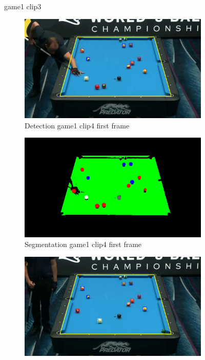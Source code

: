 \begin{figure}[H]
	\caption{game1 clip3}
\end{figure}

\begin{figure}[H]
	\centering
	\begin{subfigure}[b]{0.48\textwidth}
		\centering
		\includegraphics[width=\textwidth]{images/Detection/game1_clip4_detected_balls_first_frame.jpg}
		\caption{Detection game1 clip4 first frame}
		\label{fig: game1_clip4_first_frame_detected}
	\end{subfigure}
	\begin{subfigure}[b]{0.48\textwidth}
		\centering
		\includegraphics[width=\textwidth]{images/Segmentation/game1_clip4_segmented_balls_first_frame.jpg}
		\caption{Segmentation game1 clip4 first frame}
		\label{fig: game1_clip4_first_frame_segmented}
	\end{subfigure}
	\begin{subfigure}[b]{0.48\textwidth}
		\centering
		\includegraphics[width=\textwidth]{images/Detection/game1_clip4_detected_balls_last_frame.jpg}

\end{subfigure}
\end{figure}
